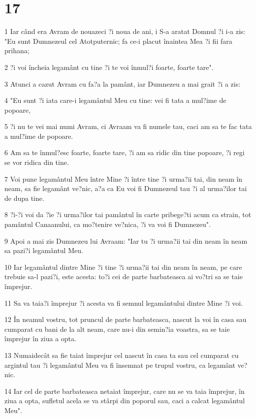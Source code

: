 \chapter{17}

\par 1 Iar când era Avram de nouazeci ?i noua de ani, i S-a aratat Domnul ?i i-a zis: "Eu sunt Dumnezeul cel Atotputernic; fa ce-i placut înaintea Mea ?i fii fara prihana;
\par 2 ?i voi încheia legamânt cu tine ?i te voi înmul?i foarte, foarte tare".
\par 3 Atunci a cazut Avram cu fa?a la pamânt, iar Dumnezeu a mai grait ?i a zis:
\par 4 "Eu sunt ?i iata care-i legamântul Meu cu tine: vei fi tata a mul?ime de popoare,
\par 5 ?i nu te vei mai numi Avram, ci Avraam va fi numele tau, caci am sa te fac tata a mul?ime de popoare.
\par 6 Am sa te înmul?esc foarte, foarte tare, ?i am sa ridic din tine popoare, ?i regi se vor ridica din tine.
\par 7 Voi pune legamântul Meu între Mine ?i între tine ?i urma?ii tai, din neam în neam, sa fie legamânt ve?nic, a?a ca Eu voi fi Dumnezeul tau ?i al urma?ilor tai de dupa tine.
\par 8 ?i-?i voi da ?ie ?i urma?ilor tai pamântul în carte pribege?ti acum ca strain, tot pamântul Canaanului, ca mo?tenire ve?nica, ?i va voi fi Dumnezeu".
\par 9 Apoi a mai zis Dumnezeu lui Avraam: "Iar tu ?i urma?ii tai din neam în neam sa pazi?i legamântul Meu.
\par 10 Iar legamântul dintre Mine ?i tine ?i urma?ii tai din neam în neam, pe care trebuie sa-l pazi?i, este acesta: to?i cei de parte barbateasca ai vo?tri sa se taie împrejur.
\par 11 Sa va taia?i împrejur ?i acesta va fi semnul legamântului dintre Mine ?i voi.
\par 12 În neamul vostru, tot pruncul de parte barbateasca, nascut la voi în casa sau cumparat cu bani de la alt neam, care nu-i din semin?ia voastra, sa se taie împrejur în ziua a opta.
\par 13 Numaidecât sa fie taiat împrejur cel nascut în casa ta sau cel cumparat cu argintul tau ?i legamântul Meu va fi însemnat pe trupul vostru, ca legamânt ve?nic.
\par 14 Iar cel de parte barbateasca netaiat împrejur, care nu se va taia împrejur, în ziua a opta, sufletul acela se va stârpi din poporul sau, caci a calcat legamântul Meu".
